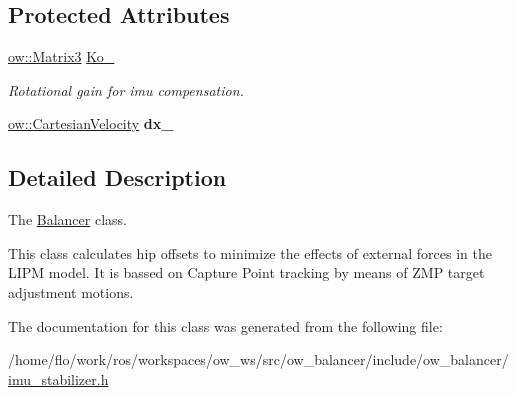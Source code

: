 \subsection*{Protected Attributes}
\begin{DoxyCompactItemize}
\item 
\hyperlink{classow__core_1_1Matrix}{ow\+::\+Matrix3} \hyperlink{classow__balancer_1_1IMUStabilizer_a8febdaf8444a65a1901af751a365bfee}{Ko\+\_\+}\hypertarget{classow__balancer_1_1IMUStabilizer_a8febdaf8444a65a1901af751a365bfee}{}\label{classow__balancer_1_1IMUStabilizer_a8febdaf8444a65a1901af751a365bfee}

\begin{DoxyCompactList}\small\item\em Rotational gain for imu compensation. \end{DoxyCompactList}\item 
\hyperlink{classow__core_1_1CartesianVelocity}{ow\+::\+Cartesian\+Velocity} {\bfseries dx\+\_\+}\hypertarget{classow__balancer_1_1IMUStabilizer_abb04ed870d7ac4c9d436d083ade61c8a}{}\label{classow__balancer_1_1IMUStabilizer_abb04ed870d7ac4c9d436d083ade61c8a}

\end{DoxyCompactItemize}


\subsection{Detailed Description}
The \hyperlink{classow__balancer_1_1Balancer}{Balancer} class. 

This class calculates hip offsets to minimize the effects of external forces in the L\+I\+PM model. It is bassed on Capture Point tracking by means of Z\+MP target adjustment motions. 

The documentation for this class was generated from the following file\+:\begin{DoxyCompactItemize}
\item 
/home/flo/work/ros/workspaces/ow\+\_\+ws/src/ow\+\_\+balancer/include/ow\+\_\+balancer/\hyperlink{imu__stabilizer_8h}{imu\+\_\+stabilizer.\+h}\end{DoxyCompactItemize}
